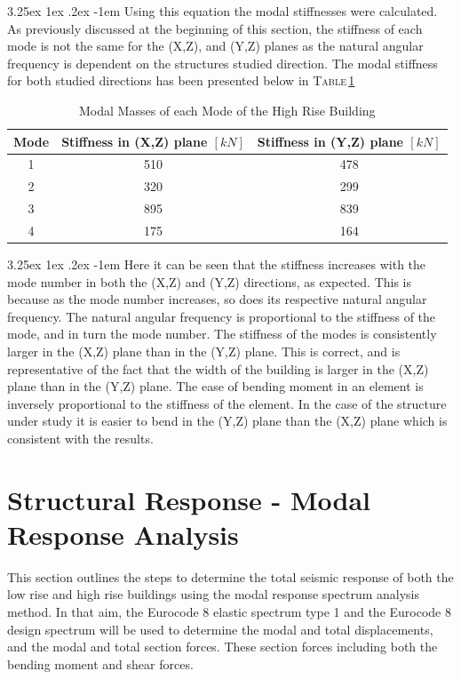 \documentclass[11pt,a4paper,titlepage]{report}
\makeatletter
\renewcommand\paragraph{\@startsection{paragraph}{5}{\z@}%
  {3.25ex \@plus1ex \@minus.2ex}%
  {-1em}%
  {\normalfont\normalsize\bfseries}}
\makeatother
\begin{document}
\paragraph{}Using this equation the modal stiffnesses were calculated. As previously discussed at the beginning of this section, the stiffness of each mode is not the same for the (X,Z), and (Y,Z) planes as the natural angular frequency is dependent on the structures studied direction. The modal stiffness for both studied directions has been presented below in \textsc{Table}\,\ref{tab:high rise modal stiffness}
\begin{table}[h]
    \centering
    \begin{tabular}{c|c|c}
        Mode & Stiffness in (X,Z) plane $[kN]$ & Stiffness in (Y,Z) plane $[kN]$\\
        \hline
         1 & 510 & 478\\
         2 & 320 & 299\\
         3 & 895 & 839\\
         4 & 175 & 164\\
    \end{tabular}
    \caption{Modal Masses of each Mode of the High Rise Building}
    \label{tab:high rise modal stiffness}
\end{table}
\paragraph{}Here it can be seen that the stiffness increases with the mode number in both the (X,Z) and (Y,Z) directions, as expected. This is because as the mode number increases, so does its respective natural angular frequency. The natural angular frequency is proportional to the stiffness of the mode, and in turn the mode number. The stiffness of the modes is consistently larger in the (X,Z) plane than in the (Y,Z) plane. This is correct, and is representative of the fact that the width of the building is larger in the (X,Z) plane than in the (Y,Z) plane. The ease of bending moment in an element is inversely proportional to the stiffness of the element. In the case of the structure under study it is easier to bend in the (Y,Z) plane than the (X,Z) plane which is consistent with the results.


\chapter{Structural Response - Modal Response Analysis}
This section outlines the steps to determine the total seismic response of both the low rise and high rise buildings using the modal response spectrum analysis method. In that aim, the Eurocode 8 elastic spectrum type 1 and the Eurocode 8 design spectrum will be used to determine the modal and total displacements, and the modal and total section forces. These section forces including both the bending moment and shear forces. 
\end{document}
